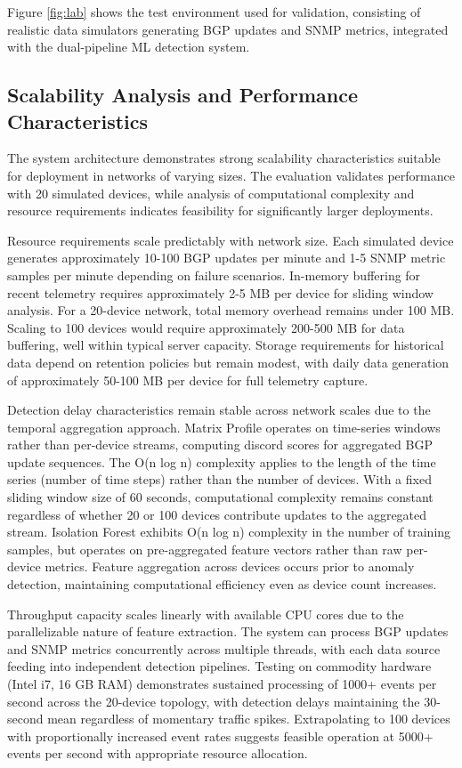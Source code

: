 \documentclass[11pt]{article}
\begin{document}
Figure \ref{fig:lab} shows the test environment used for validation, consisting of realistic data simulators generating BGP updates and SNMP metrics, integrated with the dual-pipeline ML detection system.

\subsection{Scalability Analysis and Performance Characteristics}

The system architecture demonstrates strong scalability characteristics suitable for deployment in networks of varying sizes. The evaluation validates performance with 20 simulated devices, while analysis of computational complexity and resource requirements indicates feasibility for significantly larger deployments.

Resource requirements scale predictably with network size. Each simulated device generates approximately 10-100 BGP updates per minute and 1-5 SNMP metric samples per minute depending on failure scenarios. In-memory buffering for recent telemetry requires approximately 2-5 MB per device for sliding window analysis. For a 20-device network, total memory overhead remains under 100 MB. Scaling to 100 devices would require approximately 200-500 MB for data buffering, well within typical server capacity. Storage requirements for historical data depend on retention policies but remain modest, with daily data generation of approximately 50-100 MB per device for full telemetry capture.

Detection delay characteristics remain stable across network scales due to the temporal aggregation approach. Matrix Profile operates on time-series windows rather than per-device streams, computing discord scores for aggregated BGP update sequences. The O(n log n) complexity applies to the length of the time series (number of time steps) rather than the number of devices. With a fixed sliding window size of 60 seconds, computational complexity remains constant regardless of whether 20 or 100 devices contribute updates to the aggregated stream. Isolation Forest exhibits O(n log n) complexity in the number of training samples, but operates on pre-aggregated feature vectors rather than raw per-device metrics. Feature aggregation across devices occurs prior to anomaly detection, maintaining computational efficiency even as device count increases.

Throughput capacity scales linearly with available CPU cores due to the parallelizable nature of feature extraction. The system can process BGP updates and SNMP metrics concurrently across multiple threads, with each data source feeding into independent detection pipelines. Testing on commodity hardware (Intel i7, 16 GB RAM) demonstrates sustained processing of 1000+ events per second across the 20-device topology, with detection delays maintaining the 30-second mean regardless of momentary traffic spikes. Extrapolating to 100 devices with proportionally increased event rates suggests feasible operation at 5000+ events per second with appropriate resource allocation.
\end{document}
